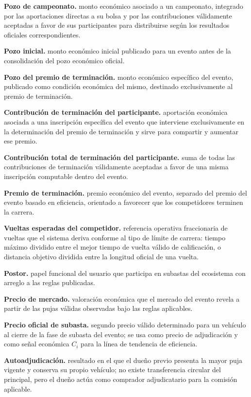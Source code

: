 \documentclass[10pt,letterpaper]{article}
\begin{document}
\noindent\textbf{Pozo de campeonato.} monto económico asociado a un campeonato, integrado por las aportaciones directas a su bolsa y por las contribuciones válidamente aceptadas a favor de sus participantes para distribuirse según los resultados oficiales correspondientes.\par
\noindent\textbf{Pozo inicial.} monto económico inicial publicado para un evento antes de la consolidación del pozo económico oficial.\par
\noindent\textbf{Pozo del premio de terminación.} monto económico específico del evento, publicado como condición económica del mismo, destinado exclusivamente al premio de terminación.\par
\noindent\textbf{Contribución de terminación del participante.} aportación económica asociada a una inscripción específica del evento que interviene exclusivamente en la determinación del premio de terminación y sirve para compartir y aumentar ese premio.\par
\noindent\textbf{Contribución total de terminación del participante.} suma de todas las contribuciones de terminación válidamente aceptadas a favor de una misma inscripción computable dentro del evento.\par
\noindent\textbf{Premio de terminación.} premio económico del evento, separado del premio del evento basado en eficiencia, orientado a favorecer que los competidores terminen la carrera.\par
\noindent\textbf{Vueltas esperadas del competidor.} referencia operativa fraccionaria de vueltas que el sistema deriva conforme al tipo de límite de carrera: tiempo máximo dividido entre el mejor tiempo de vuelta válido de calificación, o distancia objetivo dividida entre la longitud oficial de una vuelta.\par
\noindent\textbf{Postor.} papel funcional del usuario que participa en subastas del ecosistema con arreglo a las reglas publicadas.\par
\noindent\textbf{Precio de mercado.} valoración económica que el mercado del evento revela a partir de las pujas válidas observadas bajo las reglas aplicables.\par
\noindent\textbf{Precio oficial de subasta.} segundo precio válido determinado para un vehículo al cierre de la fase de subasta del evento; se usa como precio de adjudicación y como señal económica $C_i$ para la línea de tendencia de eficiencia.\par
\noindent\textbf{Autoadjudicación.} resultado en el que el dueño previo presenta la mayor puja vigente y conserva su propio vehículo; no existe transferencia circular del principal, pero el dueño actúa como comprador adjudicatario para la comisión aplicable.\par
\end{document}
